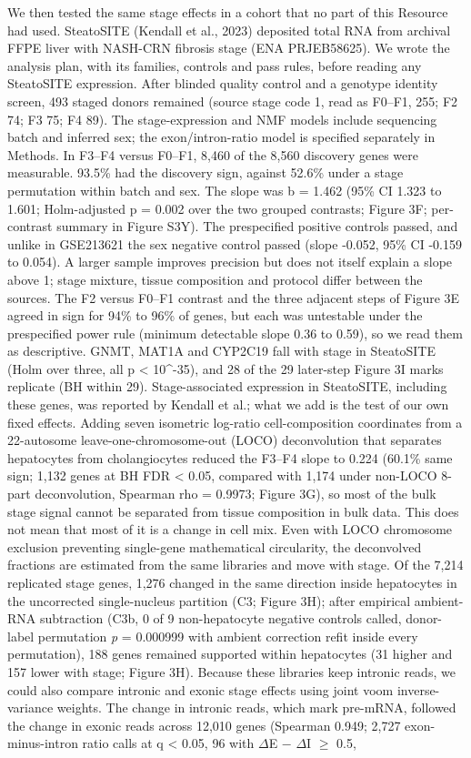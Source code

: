 We then tested the same stage effects in a cohort that no part of this Resource had used. SteatoSITE (Kendall et al., 2023) deposited total RNA from archival FFPE liver with NASH-CRN fibrosis stage (ENA PRJEB58625). We wrote the analysis plan, with its families, controls and pass rules, before reading any SteatoSITE expression. After blinded quality control and a genotype identity screen, 493 staged donors remained (source stage code 1, read as F0--F1, 255; F2 74; F3 75; F4 89). The stage-expression and NMF models include sequencing batch and inferred sex; the exon/intron-ratio model is specified separately in Methods. In F3--F4 versus F0--F1, 8,460 of the 8,560 discovery genes were measurable. 93.5\% had the discovery sign, against 52.6\% under a stage permutation within batch and sex. The slope was b = 1.462 (95\% CI 1.323 to 1.601; Holm-adjusted p = 0.002 over the two grouped contrasts; Figure 3F; per-contrast summary in Figure S3Y). The prespecified positive controls passed, and unlike in GSE213621 the sex negative control passed (slope -0.052, 95\% CI -0.159 to 0.054). A larger sample improves precision but does not itself explain a slope above 1; stage mixture, tissue composition and protocol differ between the sources. The F2 versus F0--F1 contrast and the three adjacent steps of Figure 3E agreed in sign for 94\% to 96\% of genes, but each was untestable under the prespecified power rule (minimum detectable slope 0.36 to 0.59), so we read them as descriptive. GNMT, MAT1A and CYP2C19 fall with stage in SteatoSITE (Holm over three, all p \textless{} 10\^{}-35), and 28 of the 29 later-step Figure 3I marks replicate (BH within 29). Stage-associated expression in SteatoSITE, including these genes, was reported by Kendall et al.; what we add is the test of our own fixed effects. Adding seven isometric log-ratio cell-composition coordinates from a 22-autosome leave-one-chromosome-out (LOCO) deconvolution that separates hepatocytes from cholangiocytes reduced the F3--F4 slope to 0.224 (60.1\% same sign; 1,132 genes at BH FDR \textless{} 0.05, compared with 1,174 under non-LOCO 8-part deconvolution, Spearman rho = 0.9973; Figure 3G), so most of the bulk stage signal cannot be separated from tissue composition in bulk data. This does not mean that most of it is a change in cell mix. Even with LOCO chromosome exclusion preventing single-gene mathematical circularity, the deconvolved fractions are estimated from the same libraries and move with stage. Of the 7,214 replicated stage genes, 1,276 changed in the same direction inside hepatocytes in the uncorrected single-nucleus partition (C3; Figure 3H); after empirical ambient-RNA subtraction (C3b, 0 of 9 non-hepatocyte negative controls called, donor-label permutation \emph{p} = 0.000999 with ambient correction refit inside every permutation), 188 genes remained supported within hepatocytes (31 higher and 157 lower with stage; Figure 3H). Because these libraries keep intronic reads, we could also compare intronic and exonic stage effects using joint voom inverse-variance weights. The change in intronic reads, which mark pre-mRNA, followed the change in exonic reads across 12,010 genes (Spearman 0.949; 2,727 exon-minus-intron ratio calls at q \textless{} 0.05, 96 with \textbar $\Delta$E $-$ $\Delta$I\textbar{} $\ge$ 0.5, 